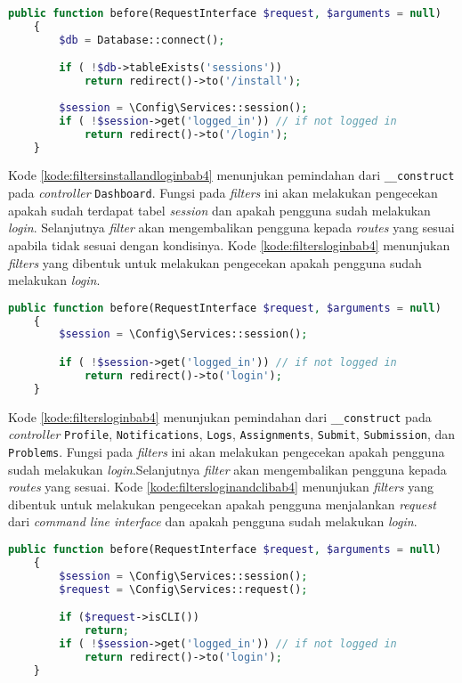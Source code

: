 \begin{lstlisting}[language=PHP, caption=Perancangan kode pada \textit{Filters} \texttt{CheckInstallAndLogin.php}, label=kode:filtersinstallandloginbab4]
	public function before(RequestInterface $request, $arguments = null)
    {   
        $db = Database::connect();

        if ( !$db->tableExists('sessions'))
			return redirect()->to('/install');
        
        $session = \Config\Services::session();
		if ( !$session->get('logged_in')) // if not logged in
			return redirect()->to('/login');
    }
\end{lstlisting}

Kode \ref{kode:filtersinstallandloginbab4} menunjukan pemindahan dari \texttt{\_\_construct} pada \textit{controller} \texttt{Dashboard}. Fungsi pada \textit{filters} ini akan melakukan pengecekan apakah sudah terdapat tabel \textit{session} dan apakah pengguna sudah melakukan \textit{login}. Selanjutnya \textit{filter} akan mengembalikan pengguna kepada \textit{routes} yang sesuai apabila tidak sesuai dengan kondisinya. Kode \ref{kode:filtersloginbab4} menunjukan \textit{filters} yang dibentuk untuk melakukan pengecekan apakah pengguna sudah melakukan \textit{login}.
\begin{lstlisting}[language=PHP, caption=Perancangan kode pada \textit{Filters} \texttt{CheckLogin.php}, label=kode:filtersloginbab4]
	public function before(RequestInterface $request, $arguments = null)
    {
        $session = \Config\Services::session();

        if ( !$session->get('logged_in')) // if not logged in
			return redirect()->to('login');
    }
\end{lstlisting}

Kode \ref{kode:filtersloginbab4} menunjukan pemindahan dari \texttt{\_\_construct} pada \textit{controller} \texttt{Profile}, \texttt{Notifications}, \texttt{Logs}, \texttt{Assignments}, \texttt{Submit}, \texttt{Submission}, dan \texttt{Problems}. Fungsi pada \textit{filters} ini akan melakukan pengecekan apakah pengguna sudah melakukan \textit{login}.Selanjutnya \textit{filter} akan mengembalikan pengguna kepada \textit{routes} yang sesuai. Kode \ref{kode:filtersloginandclibab4} menunjukan \textit{filters} yang dibentuk untuk melakukan pengecekan apakah pengguna menjalankan \textit{request} dari \textit{command line interface} dan apakah pengguna sudah melakukan \textit{login}.

\begin{lstlisting}[language=PHP, caption=Perancangan kode pada \textit{Filters} \texttt{CheckLoginandCLI.php}, label=kode:filtersloginandclibab4]
	public function before(RequestInterface $request, $arguments = null)
    {   
        $session = \Config\Services::session();
        $request = \Config\Services::request();

        if ($request->isCLI())
            return;
        if ( !$session->get('logged_in')) // if not logged in
            return redirect()->to('login');
    }
\end{lstlisting}

